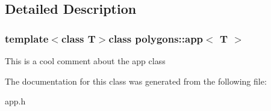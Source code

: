 \subsection{Detailed Description}
\subsubsection*{template$<$class T$>$class polygons\-::app$<$ T $>$}

This is a cool comment about the app class 

The documentation for this class was generated from the following file\-:\begin{DoxyCompactItemize}
\item 
app.\-h\end{DoxyCompactItemize}

